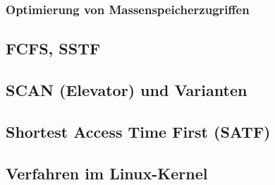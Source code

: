 \subsubsection*{Optimierung von Massenspeicherzugriffen}

\subsection{FCFS, SSTF}

\subsection{SCAN (Elevator) und Varianten}

\subsection{Shortest Access Time First (SATF)}

\subsection{Verfahren im Linux-Kernel}




